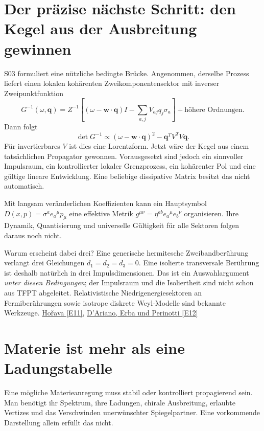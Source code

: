 \section{Der präzise nächste Schritt: den Kegel aus der Ausbreitung gewinnen}
S03 formuliert eine nützliche bedingte Brücke. Angenommen, derselbe Prozess liefert einen lokalen kohärenten Zweikomponentensektor mit inverser Zweipunktfunktion
\begin{equation}
G^{-1}(\omega,\mathbf q)=Z^{-1}
\left[(\omega-\mathbf w\cdot\mathbf q)I-\sum_{a,j}V_{aj}q_j\sigma_a\right]
+\text{höhere Ordnungen}.
\end{equation}
Dann folgt
\begin{equation}
\det G^{-1}\propto(\omega-\mathbf w\cdot\mathbf q)^2-\mathbf q^TV^TV\mathbf q.
\end{equation}
Für invertierbares $V$ ist dies eine Lorentzform. Jetzt wäre der Kegel aus einem tatsächlichen Propagator gewonnen. Vorausgesetzt sind jedoch ein sinnvoller Impulsraum, ein kontrollierter lokaler Grenzprozess, ein kohärenter Pol und eine gültige lineare Entwicklung. Eine beliebige dissipative Matrix besitzt das nicht automatisch.

Mit langsam veränderlichen Koeffizienten kann ein Hauptsymbol $D(x,p)=\sigma^ae_a{}^\mu p_\mu$ eine effektive Metrik $g^{\mu\nu}=\eta^{ab}e_a{}^\mu e_b{}^\nu$ organisieren. Ihre Dynamik, Quantisierung und universelle Gültigkeit für alle Sektoren folgen daraus noch nicht.

Warum erscheint dabei drei? Eine generische hermitesche Zweibandberührung verlangt drei Gleichungen $d_1=d_2=d_3=0$. Eine isolierte transversale Berührung ist deshalb natürlich in drei Impulsdimensionen. Das ist ein Auswahlargument \emph{unter diesen Bedingungen}; der Impulsraum und die Isoliertheit sind nicht schon aus TFPT abgeleitet. Relativistische Niedrigenergiesektoren an Fermiberührungen sowie isotrope diskrete Weyl-Modelle sind bekannte Werkzeuge. \href{https://arxiv.org/abs/hep-th/0503006}{Hořava [E11]}, \href{https://arxiv.org/abs/1708.00826}{D'Ariano, Erba und Perinotti [E12]}

\section{Materie ist mehr als eine Ladungstabelle}
Eine mögliche Materieanregung muss stabil oder kontrolliert propagierend sein. Man benötigt ihr Spektrum, ihre Ladungen, chirale Ausbreitung, erlaubte Vertizes und das Verschwinden unerwünschter Spiegelpartner. Eine vorkommende Darstellung allein erfüllt das nicht.

